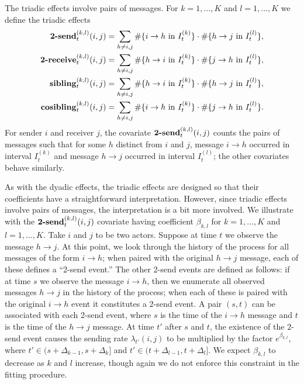 \documentclass[final]{statsoc}
\begin{document}
The triadic effects involve pairs of messages.  For $k = 1, \dotsc, K$ and $l = 1, \dotsc, K$ we define the triadic effects
\begin{align*}
  \text{\textbf{2-send}}^{(k,l)}_t(i,j)
    &= \sum_{h \neq i,j}
      \#\{ i \to h \text{ in } I_t^{(k)} \}
      \cdot \#\{ h \to j \text{ in } I_t^{(l)} \}, \\
  \text{\textbf{2-receive}}^{(k,l)}_t(i,j)
    &= \sum_{h \neq i,j}
      \#\{ h \to i \text{ in } I_t^{(k)} \}
      \cdot \#\{ j \to h \text{ in } I_t^{(l)} \}, \\
  \text{\textbf{sibling}}^{(k,l)}_t(i,j)
    &= \sum_{h \neq i,j}
      \#\{ h \to i \text{ in } I_t^{(k)} \}
      \cdot \#\{ h \to j \text{ in } I_t^{(l)} \}, \\
  \text{\textbf{cosibling}}^{(k,l)}_t(i,j)
    &= \sum_{h \neq i,j}
      \#\{ i \to h \text{ in } I_t^{(k)} \}
      \cdot \#\{ j \to h \text{ in } I_t^{(l)} \}.
\end{align*}
For sender $i$ and receiver $j$, the covariate
$\text{\textbf{2-send}}^{(k,l)}_t(i,j)$ counts the pairs of messages such that for some $h$ distinct from $i$ and $j$, message $i \to h$ occurred in interval $I_t^{(k)}$ and message $h \to j$ occurred in interval $I_t^{(l)}$; the other covariates behave similarly.

As with the dyadic effects, the triadic effects are designed so that their
coefficients have a straightforward interpretation.  However, since triadic
effects involve pairs of messages, the interpretation is a bit more involved.
We illustrate with the $\text{\textbf{2-send}}^{(k,l)}_t(i,j)$ covariate
having coefficient $\beta_{k,l}$ for $k = 1, \dotsc, K$ and $l = 1, \dotsc,
K$.  Take $i$ and $j$ to be two actors.  Suppose at time $t$ we observe the
message $h \to j$.  At this point, we look through the history of the process
for all messages of the form $i \to h$; when paired with the original $h \to
j$ message, each of these defines a ``2-send event.''  The other 2-send events
are defined as follows: if at time $s$ we observe the message $i \to h$, then
we enumerate all observed messages $h \to j$ in the history of the process;
when each of these is paired with the original $i \to h$ event it constitutes
a 2-send event.  A pair $(s,t)$ can be associated with each 2-send event,
where $s$ is the time of the $i \to h$ message and $t$ is the time of the $h
\to j$ message.  At time $t'$ after $s$ and $t$, the existence of the 2-send
event causes the sending rate $\lambda_{t'}(i,j)$ to be multiplied by the
factor $e^{\beta_{k,l}}$, where $t' \in (s + \Delta_{k-1}, s + \Delta_{k}]$
and $t' \in (t + \Delta_{l-1}, t + \Delta_l]$.  We expect $\beta_{k,l}$ to
decrease as $k$ and $l$ increase, though again we do not enforce this
constraint in the fitting procedure.
\end{document}
